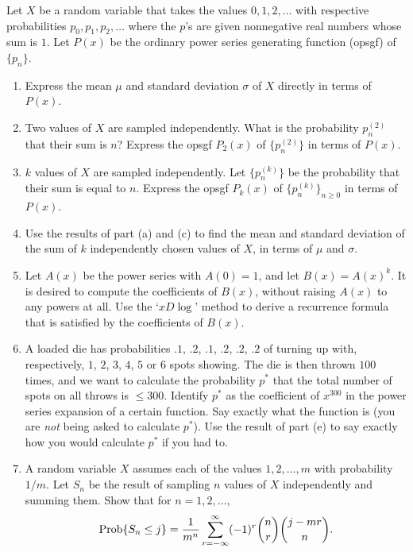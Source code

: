 \begin{exercise}
    Let $X$ be a random variable that takes the values $0,1,2,\ldots$ with respective probabilities $p_0, p_1,p_2,\ldots$ where the $p$'s are given nonnegative real numbers whose sum is $1$. Let $P(x)$ be the ordinary power series generating function (opsgf) of $\{p_n\}$.
    \begin{enumerate}[label=(\alph*)]
        \item Express the mean $\mu$ and standard deviation $\sigma$ of $X$ directly in terms of~$P(x)$.
        \item Two values of $X$ are sampled independently. What is the probability $p_n^{(2)}$ that their sum is $n$? Express the opsgf $P_2(x)$ of $\{p_n^{(2)}\}$ in terms of $P(x)$.
        \item $k$ values of $X$ are sampled independently. Let $\{p_n^{(k)}\}$ be the probability that their sum is equal to $n$. Express the opsgf $P_k(x)$ of $\{p_n^{(k)}\}_{n\geq 0}$ in terms of $P(x)$.
        \item Use the results of part (a) and (c)  to find the mean and standard deviation of the sum of $k$ independently chosen values of $X$, in terms of $\mu$ and $\sigma$.
        \item Let $A(x)$ be the power series with $A(0) = 1$, and let $B(x) = A(x)^k$. It is desired to compute the coefficients of $B(x)$, without raising $A(x)$ to any powers at all. Use the `$xD\log$' method to derive a recurrence formula that is satisfied by the coefficients of $B(x)$.
        \item A loaded die has probabilities $.1$, $.2$, $.1$, $.2$, $.2$, $.2$ of turning up with, respectively, $1$, $2$, $3$, $4$, $5$ or $6$ spots showing. The die is then thrown $100$ times, and we want to calculate the probability $p^*$ that the total number of spots on all throws is $\leq 300$. Identify $p^*$ as the coefficient of $x^{300}$ in the power series expansion of a certain function. Say exactly what the function is (you are \emph{not} being asked to calculate $p^*$). Use the result of part (e) to say exactly how you would calculate $p^*$ if you had to.
        \item A random variable $X$ assumes each of the values $1,2,\ldots,m$ with probability $1/m$. Let $S_n$ be the result of sampling $n$ values of $X$ independently and summing them. Show that for $n=1,2,\ldots,$
        \[
            \prob \{S_n \leq j\} = \frac{1}{m^n}\infsum[r] (-1)^r \binom{n}{r}\binom{j-mr}{n}.
        \]
    \end{enumerate}
\end{exercise}
